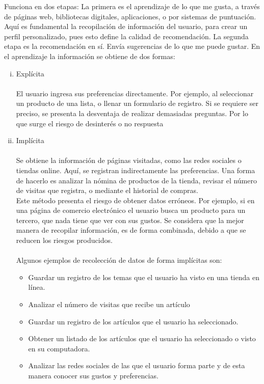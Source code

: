 \documentclass[11pt,a4paper]{article}
\begin{document}
	 		Funciona en dos etapas: La primera es el aprendizaje de lo que me gusta, a través de páginas web, bibliotecas digitales, aplicaciones, o por sistemas de puntuación. Aquí es fundamental la recopilación de información del usuario, para crear un perfil personalizado, pues esto define la calidad de recomendación. La segunda etapa es la recomendación en sí. Envía sugerencias de lo que me puede gustar.
	 		En el aprendizaje la información se obtiene de dos formas:
	 		\begin{enumerate}[i.]
	 			\item Explícita\\
	 			\\
	 			El usuario ingresa sus preferencias directamente. Por ejemplo, al seleccionar un producto de una lista, o llenar un formulario de registro. Si se requiere ser preciso, se presenta la desventaja de realizar demasiadas preguntas. Por lo que surge el riesgo de desinterés o no respuesta
	 			
	 			\item Implícita\\
	 			\\
	 			Se obtiene la información de páginas visitadas, como las redes sociales o tiendas online. Aquí, se registran indirectamente las preferencias. Una forma de hacerlo es analizar la nómina de productos de la tienda, revisar el número de visitas que registra, o mediante el historial de compras. \\
	 			Este método presenta el riesgo de obtener datos erróneos. Por ejemplo, si en una página de comercio electrónico el usuario busca un producto para un tercero, que nada tiene que ver con sus gustos. Se considera que la mejor manera de recopilar información, es de forma combinada, debido a que se reducen los riesgos producidos.\\
	 			\\
	 			Algunos ejemplos de recolección de datos de forma implícitas son:
	 			
	 				\begin{itemize}
	 					\item Guardar un registro de los temas que el usuario ha visto en una tienda en línea.
	 					\item Analizar el número de visitas que recibe un artículo
	 					\item Guardar un registro de los artículos que el usuario ha seleccionado.
	 					\item Obtener un listado de los artículos que el usuario ha seleccionado o visto en su computadora.
	 					\item Analizar las redes sociales de las que el usuario forma parte y de esta manera conocer sus gustos y preferencias.
	 				\end{itemize}
	 		\end{enumerate}
	 		
\end{document}
